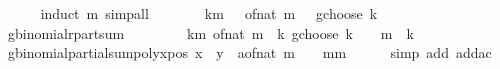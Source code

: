 \begin{isabellebody}
\ \ \ \ \isamarkupfalse%
\ {\isacharparenleft}{\kern0pt}induct\ m{\isacharparenright}{\kern0pt}\ simp{\isacharunderscore}{\kern0pt}all\isanewline
\ \ \isamarkupfalse%
\ \isamarkupfalse%
\ {\isachardoublequoteopen}{\isasymdots}\ {\isacharequal}{\kern0pt}\ {\isacharparenleft}{\kern0pt}{\isasymSum}k{\isasymle}m{\isachardot}{\kern0pt}\ {\isacharparenleft}{\kern0pt}{}\ {\isacharasterisk}{\kern0pt}\ {\isacharparenleft}{\kern0pt}of{\isacharunderscore}{\kern0pt}nat\ m{\isacharparenright}{\kern0pt}\ {\isacharplus}{\kern0pt}\ {}\ gchoose\ k{\isacharparenright}{\kern0pt}{\isacharparenright}{\kern0pt}{\isachardoublequoteclose}\isanewline
\ \ \ \ \isamarkupfalse%
\ gbinomial{\isacharunderscore}{\kern0pt}r{\isacharunderscore}{\kern0pt}part{\isacharunderscore}{\kern0pt}sum\ \isacommand{{\isachardot}{\kern0pt}{\isachardot}{\kern0pt}}\isamarkupfalse%
\isanewline
\ \ \isamarkupfalse%
\ \isamarkupfalse%
\ {\isachardoublequoteopen}{\isasymdots}\ {\isacharequal}{\kern0pt}\ {\isacharparenleft}{\kern0pt}{\isasymSum}k{\isasymle}m{\isachardot}{\kern0pt}\ {\isacharparenleft}{\kern0pt}of{\isacharunderscore}{\kern0pt}nat\ {\isacharparenleft}{\kern0pt}m\ {\isacharplus}{\kern0pt}\ k{\isacharparenright}{\kern0pt}\ gchoose\ k{\isacharparenright}{\kern0pt}\ {\isacharasterisk}{\kern0pt}\ {}\ {\isacharcircum}{\kern0pt}\ {\isacharparenleft}{\kern0pt}m\ {\isacharminus}{\kern0pt}\ k{\isacharparenright}{\kern0pt}{\isacharparenright}{\kern0pt}{\isachardoublequoteclose}\isanewline
\ \ \ \ \isamarkupfalse%
\ gbinomial{\isacharunderscore}{\kern0pt}partial{\isacharunderscore}{\kern0pt}sum{\isacharunderscore}{\kern0pt}poly{\isacharunderscore}{\kern0pt}xpos{\isacharbrackleft}{\kern0pt}\ x{\isacharequal}{\kern0pt}{\isachardoublequoteopen}{}{\isachardoublequoteclose}\ \ y{\isacharequal}{\kern0pt}{\isachardoublequoteopen}{}{\isachardoublequoteclose}\ \ a{\isacharequal}{\kern0pt}{\isachardoublequoteopen}of{\isacharunderscore}{\kern0pt}nat\ m\ {\isacharplus}{\kern0pt}\ {}{\isachardoublequoteclose}\ \ m{\isacharequal}{\kern0pt}{\isachardoublequoteopen}m{\isachardoublequoteclose}{\isacharbrackright}{\kern0pt}\isanewline
\ \ \ \ \isamarkupfalse%
\ {\isacharparenleft}{\kern0pt}simp\ add{\isacharcolon}{\kern0pt}\ add{\isacharunderscore}{\kern0pt}ac{\isacharparenright}{\kern0pt}\isanewline
\ \ \isamarkupfalse%
\ \isamarkupfalse%

\end{isabellebody}
